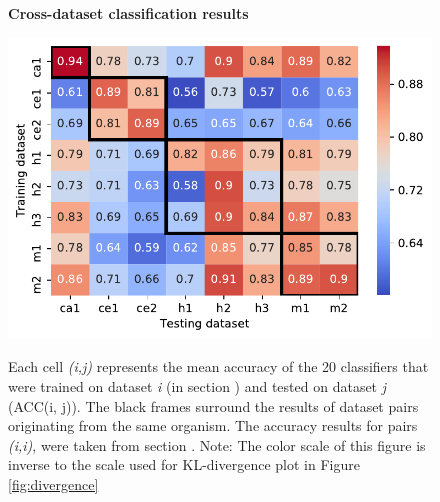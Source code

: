 \begin{figure}[h!]
  \caption{\textbf{Cross-dataset classification results}}
      \includegraphics[width = 1\textwidth]{figures/6_diff_summary.pdf}
    \label{fig:crossdataset}
    \caption*{Each cell \textit{(i,j)} represents the mean accuracy of the 20 classifiers that were trained on dataset \textit{i} (in section ) and tested on dataset \textit{j} (ACC(i, j)). The black frames surround the results of dataset pairs originating from the same organism. The accuracy results for pairs \textit{(i,i)}, were taken from section . Note: The color scale of this figure is inverse to the scale used for KL-divergence plot in Figure \ref{fig:divergence}}
      \end{figure}




